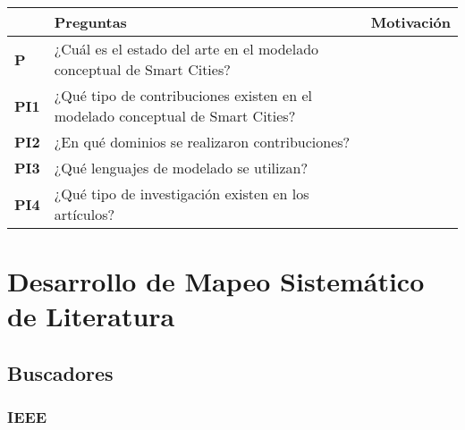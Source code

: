 \documentclass[runningheads,a4paper,spanish]{llncs}
\begin{document}
\begin{table}[]
  \begin{tabular}{|l|l|l|}
  \hline
               & Preguntas                                                                      & Motivación \\ \hline
  \textbf{P}   & ¿Cuál es el estado del arte en el modelado conceptual de Smart Cities?         &            \\ \hline
  \textbf{PI1} & ¿Qué tipo de contribuciones existen en el modelado conceptual de Smart Cities? &            \\ \hline
  \textbf{PI2} & ¿En qué dominios se realizaron contribuciones?                                 &            \\ \hline
  \textbf{PI3} & ¿Qué lenguajes de modelado se utilizan?                                        &            \\ \hline
  \textbf{PI4} & ¿Qué tipo de investigación existen en los artículos?                           &            \\ \hline
  \end{tabular}
  \end{table}

 

\section{Desarrollo de Mapeo Sistemático de Literatura}

\subsection{Buscadores}\label{fuentes}


\subsubsection{IEEE}\label{ieee}
\end{document}
